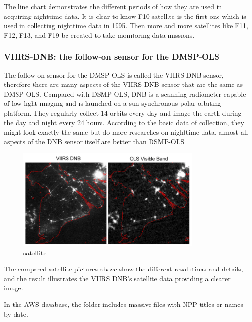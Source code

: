 \documentclass[conference]{IEEEtran}
\begin{document}
The line chart demonstrates the different periods of how they are used in acquiring nighttime data.  It is clear to know F10 satellite 
is the first one which is used in collecting nighttime data in 1995. Then more and more satellites like F11, F12, F13, and F19 be created 
to take monitoring data missions.

\subsubsection{VIIRS-DNB: the follow-on sensor for the DMSP-OLS}

The follow-on sensor for the DMSP-OLS is called the VIIRS-DNB sensor, therefore there are many aspects of the VIIRS-DNB sensor that 
are the same as DMSP-OLS. Compared with DSMP-OLS, DNB is a scanning radiometer capable of low-light imaging and is launched on a sun-synchronous 
polar-orbiting platform. They regularly collect 14 orbits every day and image the earth during the day and night every 24 hours. According to 
the basic data of collection, they might look exactly the same but do more researches on nighttime data, almost all aspects of the DNB sensor 
itself are better than DSMP-OLS.

\begin{figure}[htbp]
\centerline{\includegraphics[width=260pt]{images/3.png}}
\caption{satellite}
\label{satellite1}
\end{figure}

The compared satellite pictures above show the different resolutions and details, and the result illustrates the VIIRS DNB's satellite 
data providing a clearer image.

In the AWS database, the folder includes massive files with NPP titles or names by date. 
\end{document}
